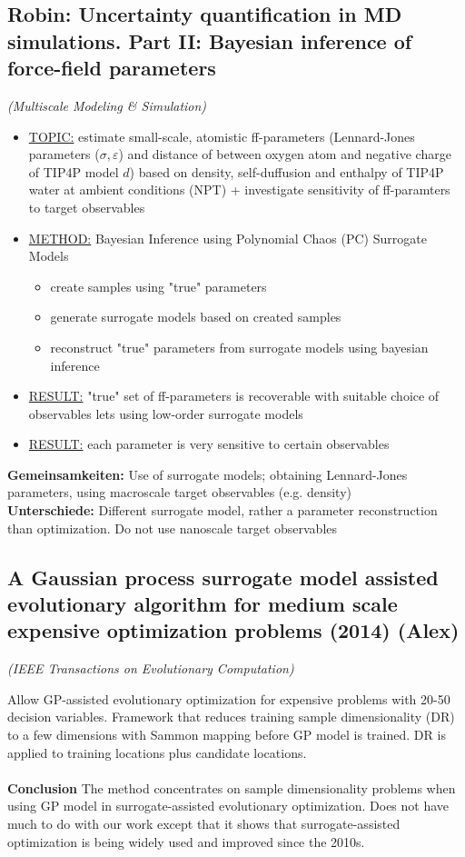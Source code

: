 \documentclass[preprint,12pt]{elsarticle}
\begin{document}
\subsection{Robin: Uncertainty quantification in MD simulations. Part II: Bayesian inference of force-field parameters}
\textit{(Multiscale Modeling \& Simulation)} \cite{rizzi2012uncertainty}
\begin{itemize}
    \item \underline{TOPIC:} estimate small-scale, atomistic ff-parameters (Lennard-Jones parameters ($\sigma, \varepsilon$) and distance of between oxygen atom and negative charge of TIP4P model $d$) based on density, self-duffusion and enthalpy of TIP4P water at ambient conditions (NPT) + investigate sensitivity of ff-paramters to target observables
    \item \underline{METHOD:} Bayesian Inference using Polynomial Chaos (PC) Surrogate Models
    \begin{itemize}
        \item create samples using "true" parameters
        \item generate surrogate models based on created samples
        \item reconstruct "true" parameters from surrogate models using bayesian inference
    \end{itemize}
    \item \underline{RESULT:} "true" set of ff-parameters is recoverable with suitable choice of observables lets using low-order surrogate models
    \item \underline{RESULT:} each parameter is very sensitive to certain observables
\end{itemize}
\textbf{Gemeinsamkeiten:} Use of surrogate models; obtaining Lennard-Jones parameters, using macroscale target observables (e.g. density)\\
\textbf{Unterschiede:} Different surrogate model, rather a parameter reconstruction than optimization. Do not use nanoscale target observables\\

\subsection{A Gaussian process surrogate model assisted evolutionary algorithm for medium scale expensive optimization problems (2014) (Alex)} \textit{(IEEE Transactions on Evolutionary Computation)}\cite{liu2013gaussian}

Allow GP-assisted evolutionary optimization for expensive problems with 20-50 decision variables. Framework that reduces training sample dimensionality (DR) to a few dimensions with Sammon mapping before GP model is trained. DR is applied to training locations plus candidate locations.\\ \\
\textbf{Conclusion} The method concentrates on sample dimensionality problems when using GP model in surrogate-assisted evolutionary optimization. Does not have much to do with our work except that it shows that surrogate-assisted optimization is being widely used and improved since the 2010s.
\end{document}
